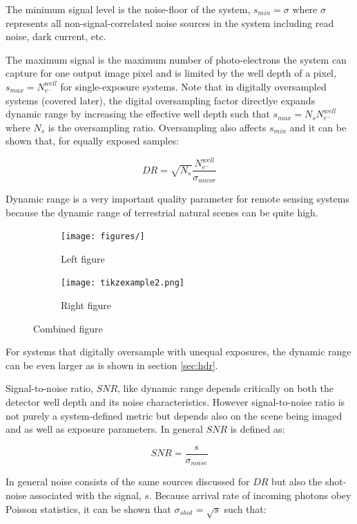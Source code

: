 \documentclass[10pt,journal]{IEEEtran}  %
\begin{document}
The minimum signal level is the noise-floor of the system, $s_{min} = \sigma$ where $\sigma$ represents all non-signal-correlated noise sources in the system including read noise, dark current, etc.

The maximum signal is the maximum number of photo-electrons the system can capture for one output image pixel and is limited by the well depth of a pixel, $s_{max} = N_{e^-}^{well}$ for single-exposure systems.  Note that in digitally oversampled systems (covered later), the digital oversampling factor directlye expands dynamic range by increasing the effective well depth such that $s_{max} = N_s N_{e^-}^{well}$ where $N_s$ is the oversampling ratio.  Oversampling also affects $s_{min}$ and it can be shown that, for equally exposed samples:

\begin{equation}
    DR = \sqrt{N_s}\frac{N_{e^-}^{well}}{\sigma_{uncor}}
\label{eq:DR_OS}
\end{equation}

Dynamic range is a very important quality parameter for remote sensing systems because the dynamic range of terrestrial natural scenes can be quite high.  

\begin{figure}
\centering
\begin{subfigure}{0.49\textwidth}
\centering
\texttt{[image: figures/]}
\caption{Left figure}
\label{fig:left}
\end{subfigure}
\begin{subfigure}{0.49\textwidth}
\centering
\texttt{[image: tikzexample2.png]}
\caption{Right figure}
\label{fig:right}
\end{subfigure}
\caption{Combined figure}
\label{fig:combined}
\end{figure}

For systems that digitally oversample with unequal exposures, the dynamic range can be even larger as is shown in section \ref{sec:hdr}.

Signal-to-noise ratio, $SNR$, like dynamic range depends critically on both the detector well depth and its noise characteristics.  However signal-to-noise ratio is not purely a system-defined metric but depends also on the scene being imaged and as well as exposure parameters.  In general $SNR$ is defined as:

$$SNR = \frac{s}{\sigma_{noise}}$$

In general noise consists of the same sources discussed for $DR$ but also the shot-noise associated with the signal, $s$.  Because arrival rate of incoming photons obey Poisson statistics, it can be shown that $\sigma_{shot} = \sqrt{s}$ such that:
\end{document}
